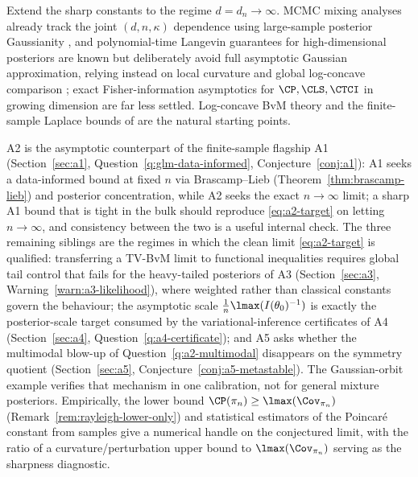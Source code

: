 \documentclass[../../main.tex]{subfiles}
\begin{document}
\begin{question}[Growing dimension $d=d_n$]
\label{q:a2-highdim}
Extend the sharp constants to the regime $d=d_n\to\infty$. MCMC mixing analyses already track
the joint $(d,n,\kappa)$ dependence using large-sample posterior Gaussianity
\cite{TangYang2024MALA}, and polynomial-time Langevin guarantees for high-dimensional
posteriors are known but deliberately avoid full asymptotic Gaussian approximation, relying
instead on local curvature and global log-concave comparison \cite{NicklWang2024Langevin};
exact Fisher-information asymptotics for $\CP,\CLS,\CTCI$ in growing dimension are far less
settled. Log-concave BvM theory \cite{Brunel2026LogConcaveBvM} and the finite-sample Laplace
bounds of \cite{KasprzakGiordanoBroderick2025} are the natural starting points.
\end{question}

\begin{remark}
\label{rem:a2-relations}
A2 is the asymptotic counterpart of the finite-sample flagship A1
(Section~\ref{sec:a1}, Question~\ref{q:glm-data-informed}, Conjecture~\ref{conj:a1}): A1 seeks a
data-informed bound at fixed $n$ via Brascamp--Lieb (Theorem~\ref{thm:brascamp-lieb}) and
posterior concentration, while A2 seeks the exact $n\to\infty$ limit; a sharp A1 bound that is
tight in the bulk should reproduce \eqref{eq:a2-target} on letting $n\to\infty$, and consistency
between the two is a useful internal check. The three remaining siblings are the regimes in which
the clean limit \eqref{eq:a2-target} is qualified: transferring a TV-BvM limit to functional
inequalities requires global tail control that fails for the heavy-tailed posteriors of A3
(Section~\ref{sec:a3}, Warning~\ref{warn:a3-likelihood}), where weighted rather than classical
constants govern the behaviour; the asymptotic scale
$\tfrac1n\lmax(I(\theta_0)^{-1})$ is exactly the posterior-scale
target consumed by the variational-inference certificates of A4 (Section~\ref{sec:a4},
Question~\ref{q:a4-certificate}); and A5 asks whether the multimodal blow-up of
Question~\ref{q:a2-multimodal} disappears on the symmetry quotient
(Section~\ref{sec:a5}, Conjecture~\ref{conj:a5-metastable}). The Gaussian-orbit example verifies
that mechanism in one calibration, not for general mixture posteriors. Empirically, the lower bound
$\CP(\pi_n)\ge\lmax(\Cov_{\pi_n})$
(Remark~\ref{rem:rayleigh-lower-only}) and statistical estimators of the Poincar\'e constant
from samples \cite{PillaudVivienEtAl2020} give a numerical handle on the conjectured limit,
with the ratio of a curvature/perturbation upper bound to $\lmax(\Cov_{\pi_n})$ serving as the
sharpness diagnostic.
\end{remark}
\end{document}
